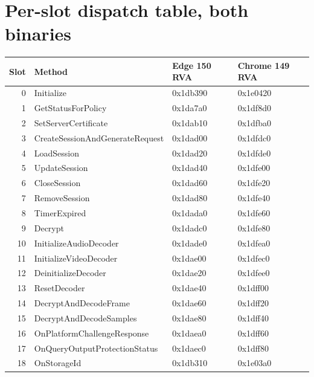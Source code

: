 \documentclass[11pt,letterpaper]{article}
\let\oldsection\section
\renewcommand{\section}{\clearpage\oldsection}
\begin{document}
\appendix

\section{Per-slot dispatch table, both binaries}
\label{app:slot-table}

\begin{center}\footnotesize
\begin{tabular}{rlll}
\toprule
\textbf{Slot} & \textbf{Method} & \textbf{Edge 150 RVA} & \textbf{Chrome 149 RVA} \\
\midrule
0  & Initialize                       & 0x1db390 & 0x1e0420 \\
1  & GetStatusForPolicy                & 0x1da7a0 & 0x1df8d0 \\
2  & SetServerCertificate              & 0x1dab10 & 0x1dfba0 \\
3  & CreateSessionAndGenerateRequest   & 0x1dad00 & 0x1dfdc0 \\
4  & LoadSession                       & 0x1dad20 & 0x1dfde0 \\
5  & UpdateSession                     & 0x1dad40 & 0x1dfe00 \\
6  & CloseSession                      & 0x1dad60 & 0x1dfe20 \\
7  & RemoveSession                     & 0x1dad80 & 0x1dfe40 \\
8  & TimerExpired                      & 0x1dada0 & 0x1dfe60 \\
9  & Decrypt                           & 0x1dadc0 & 0x1dfe80 \\
10 & InitializeAudioDecoder            & 0x1dade0 & 0x1dfea0 \\
11 & InitializeVideoDecoder            & 0x1dae00 & 0x1dfec0 \\
12 & DeinitializeDecoder               & 0x1dae20 & 0x1dfee0 \\
13 & ResetDecoder                      & 0x1dae40 & 0x1dff00 \\
14 & DecryptAndDecodeFrame             & 0x1dae60 & 0x1dff20 \\
15 & DecryptAndDecodeSamples           & 0x1dae80 & 0x1dff40 \\
16 & OnPlatformChallengeResponse       & 0x1daea0 & 0x1dff60 \\
17 & OnQueryOutputProtectionStatus     & 0x1daec0 & 0x1dff80 \\
18 & OnStorageId                       & 0x1db310 & 0x1e03a0 \\
\bottomrule
\end{tabular}
\end{center}
\end{document}
